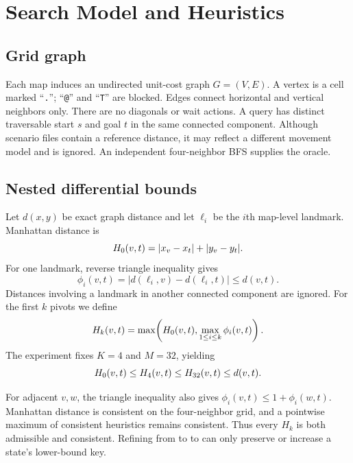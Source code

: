 \section{Search Model and Heuristics}
\label{sec:model}

\subsection{Grid graph}

Each map induces an undirected unit-cost graph $G=(V,E)$.  A vertex is a cell
marked ``\texttt{.}''; ``\texttt{@}'' and ``\texttt{T}'' are blocked.  Edges
connect horizontal and vertical neighbors only.  There are no diagonals or
wait actions.  A query has distinct traversable start $s$ and goal $t$ in the
same connected component.  Although scenario files contain a reference
distance, it may reflect a different movement model and is ignored.  An
independent four-neighbor BFS supplies the oracle.

\subsection{Nested differential bounds}

Let $d(x,y)$ be exact graph distance and let $\ell_i$ be the $i$th map-level
landmark.  Manhattan distance is
\begin{equation}
  H_0(v,t)=|x_v-x_t|+|y_v-y_t|.
\end{equation}
For one landmark, reverse triangle inequality gives
\begin{equation}
  \phi_i(v,t)=|d(\ell_i,v)-d(\ell_i,t)| \leq d(v,t).
\end{equation}
Distances involving a landmark in another connected component are ignored.
For the first $k$ pivots we define
\begin{equation}
 H_k(v,t)=\max\!\left(H_0(v,t),\max_{1\leq i\leq k}
                         \phi_i(v,t)\right).
 \label{eq:hk}
\end{equation}
The experiment fixes $K=4$ and $M=32$, yielding
\begin{equation}
 H_0(v,t)\leq H_4(v,t)\leq H_{32}(v,t)\leq d(v,t).
 \label{eq:nesting}
\end{equation}

For adjacent $v,w$, the triangle inequality also gives
$\phi_i(v,t)\leq 1+\phi_i(w,t)$.  Manhattan distance is consistent on the
four-neighbor grid, and a pointwise maximum of consistent heuristics remains
consistent.  Thus every $H_k$ is both admissible and consistent.  Refining
from \HMan{} to \HPrefix{} to \HFull{} can only preserve or increase a
state's lower-bound key.

